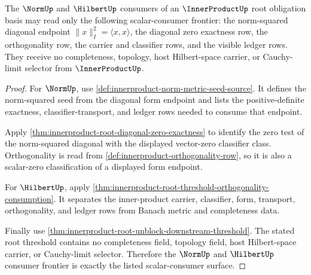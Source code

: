 \begin{theorem}
\label{thm:innerproduct-root-norm-hilbert-consumer-frontier}
The $\NormUp$ and $\HilbertUp$ consumers of an $\InnerProductUp$ root
obligation basis may read only the following scalar-consumer frontier:
the norm-squared diagonal endpoint $\|x\|_{I}^{2}=\langle x,x\rangle$,
the diagonal zero exactness row, the orthogonality row, the carrier and
classifier rows, and the visible ledger rows. They receive no completeness,
topology, host Hilbert-space carrier, or Cauchy-limit selector from
$\InnerProductUp$.
\end{theorem}
\begin{proof}
For $\NormUp$, use \autoref{def:innerproduct-norm-metric-seed-source}. It
defines the norm-squared seed from the diagonal form endpoint and lists the
positive-definite exactness, classifier-transport, and ledger rows needed to
consume that endpoint.

Apply \autoref{thm:innerproduct-root-diagonal-zero-exactness} to identify
the zero test of the norm-squared diagonal with the displayed vector-zero
classifier class. Orthogonality is read from
\autoref{def:innerproduct-orthogonality-row}, so it is also a scalar-zero
classification of a displayed form endpoint.

For $\HilbertUp$, apply
\autoref{thm:innerproduct-root-threshold-orthogonality-consumption}. It
separates the inner-product carrier, classifier, form, transport,
orthogonality, and ledger rows from Banach metric and completeness data.

Finally use \autoref{thm:innerproduct-root-unblock-downstream-threshold}.
The stated root threshold contains no completeness field, topology field,
host Hilbert-space carrier, or Cauchy-limit selector. Therefore the
$\NormUp$ and $\HilbertUp$ consumer frontier is exactly the listed
scalar-consumer surface.
\end{proof}
